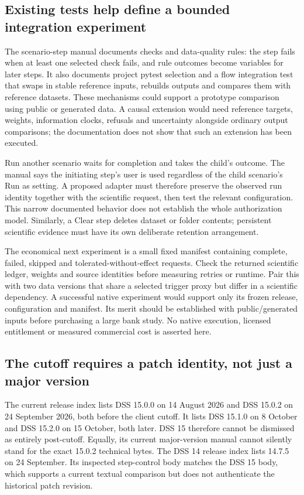 \subsection{Existing tests help define a bounded integration experiment}

The scenario-step manual documents checks and data-quality rules: the step
fails when at least one selected check fails, and rule outcomes become
variables for later steps. It also documents project pytest selection and a
flow integration test that swaps in stable reference inputs, rebuilds outputs
and compares them with reference datasets. These mechanisms could support a
prototype comparison using public or generated data. A causal extension would
need reference targets, weights, information clocks, refusals and uncertainty
alongside ordinary output comparisons; the documentation does not show that
such an extension has been executed.
\citep{exec23_dss_latest_steps}

Run another scenario waits for completion and takes the child's outcome.
The manual says the initiating step's user is used regardless of the child
scenario's Run as setting. A proposed adapter must therefore preserve the
observed run identity together with the scientific request, then test the
relevant configuration. This narrow documented behavior does not establish
the whole authorization model. Similarly, a Clear step deletes dataset or
folder contents; persistent scientific evidence must have its own deliberate
retention arrangement.\citep{exec23_dss_latest_steps}

The economical next experiment is a small fixed manifest containing complete,
failed, skipped and tolerated-without-effect requests. Check the returned
scientific ledger, weights and source identities before measuring retries or
runtime. Pair this with two data versions that share a selected trigger proxy
but differ in a scientific dependency. A successful native experiment would
support only its frozen release, configuration and manifest. Its merit should
be established with public/generated inputs before purchasing a large bank
study. No native execution, licensed entitlement or measured commercial cost
is asserted here.

\subsection{The cutoff requires a patch identity, not just a major version}
\label{exec23:dss-cutoff}

The current release index lists DSS 15.0.0 on 14 August 2026 and DSS 15.0.2 on
24 September 2026, both before the client cutoff. It lists DSS 15.1.0 on
8 October and DSS 15.2.0 on 15 October, both later. DSS 15 therefore cannot be
dismissed as entirely post-cutoff. Equally, its current major-version manual
cannot silently stand for the exact 15.0.2 technical bytes. The DSS 14 release
index lists 14.7.5 on 24 September. Its inspected step-control body matches
the DSS 15 body, which supports a current textual comparison but does not
authenticate the historical patch revision.
\citep{exec23_dss_latest_releases,exec23_dss_dss14_releases,
exec23_dss_latest_flow,exec23_dss_dss14_flow}

